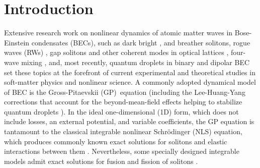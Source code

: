 \documentclass[preprintnumbers]{revtex4}
\begin{document}
\maketitle

\section{Introduction}

Extensive research work on nonlinear dynamics of atomic matter waves in
Bose-Einstein condensates (BECs), such as dark \cite{1,2,6} bright \cite%
{6,7,8}, and breather \cite{breather1,breather2} solitons, rogue waves (RWs)
\cite{9,10}, gap solitons and other coherent modes in optical lattices \cite%
{11,Morsch}, four-wave mixing \cite{12}, and, most recently, quantum
droplets in binary \cite{Petrov,binary} and dipolar \cite{dipolar} BEC set
these topics at the forefront of current experimental and theoretical
studies in soft-matter physics and nonlinear science. A commonly adopted
dynamical model of BEC is the Gross-Pitaevskii (GP)\ equation (including the
Lee-Huang-Yang corrections that account for the beyond-mean-field effects
helping to stabilize quantum droplets \cite{Petrov}). In the ideal
one-dimensional (1D) form, which does not include losses, an external
potential, and variable coefficients, the GP equation is tantamount to the
classical integrable nonlinear Schr\"{o}dinger (NLS) equation, which
produces commonly known exact solutions for solitons and elastic
interactions between them \cite{Zakharov,21}. %
Nevertheless, some specially designed integrable models admit exact
solutions for fusion and fission of solitons \cite{15,16,we}.
\end{document}
